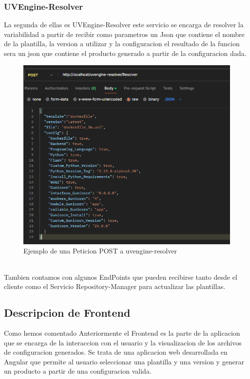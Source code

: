 \documentclass[12pt, a4paper, twoside]{article}
\begin{document}
\newpage
\subsubsection{UVEngine-Resolver}

La segunda de ellas es UVEngine-Resolver este servicio se encarga de resolver la variabilidad a partir de recibir como parametros un Json que contiene el nombre de la plantilla, la version a utilizar y la configuracion 
el resultado de la funcion sera un json que contiene el producto generado a partir de la configuracion dada. 
\begin{figure}[h]
	\centering
	  \includegraphics[width=1\textwidth]{Peticion POST uvengine-resolver.png}
	\caption{Ejemplo de una Peticion POST a uvengine-resolver}
\end{figure}
\\
Tambien contamos con algunos EndPoints que pueden recibirse tanto desde el cliente como el Servicio Repository-Manager para actualizar las plantillas.
\newpage
\subsection{Descripcion de Frontend}
Como hemos comentado Anteriormente el Frontend es la parte de la aplicacion que se encarga de la interaccion con el usuario y la visualizacion de los archivos de configuracion generados.
Se trata de una aplicacion web desarrollada en Angular que permite al usuario seleccionar una plantilla y una version y generar un producto a partir de una configuracion valida.
\end{document}
